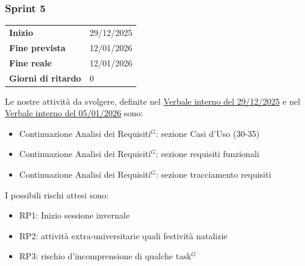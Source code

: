 \subsubsection{Sprint 5}


\begin{tabular}{p{} p{}}
	\textbf{Inizio} & 29/12/2025 \\
	\textbf{Fine prevista} & 12/01/2026 \\
	\textbf{Fine reale} &  12/01/2026\\
	\textbf{Giorni di ritardo} & 0
\end{tabular}
\newline \newline 
Le nostre attività da svolgere, definite nel \href{https://nullpointersgroup.github.io/Documentazione/output/RTB/Verbali%20Interni/2025-12-29_verbale_interno.pdf}{Verbale interno del 29/12/2025} e nel \href{https://nullpointersgroup.github.io/Documentazione/output/RTB/Verbali%20Interni/2026-01-05_verbale_interno.pdf}{Verbale interno del 05/01/2026} sono:
\begin{itemize}[itemsep=5pt, parsep=1pt, label=$\scriptstyle\bullet$]
	\item Continuazione Analisi dei Requisiti$^G$: sezione Casi d’Uso (30-35)
	\item Continuazione Analisi dei Requisiti$^G$: sezione requisiti funzionali
	\item Continuazione Analisi dei Requisiti$^G$: sezione tracciamento requisiti
\end{itemize}

I possibili rischi attesi sono:
\begin{itemize}[itemsep=5pt, parsep=1pt, label=$\scriptstyle\bullet$]
	\item RP1: Inizio sessione invernale
	\item RP2: attività extra-universitarie quali festività natalizie
	\item RP3: rischio d'incomprensione di qualche task$^G$
\end{itemize}

